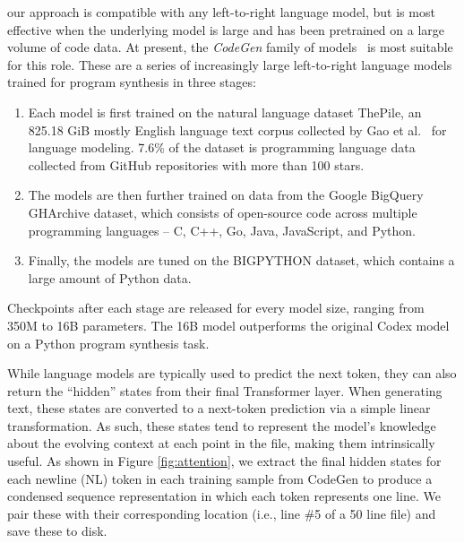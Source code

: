 \documentclass[12pt,openany,oneside,table]{cmuthesis}
\begin{document}
our approach is compatible with any left-to-right language model, but is most effective when the underlying model is large and has been pretrained on a large volume of code data. At present, the \textit{CodeGen} family of models~\cite{nijkamp2022codegen} is most suitable for this role. These are a series of increasingly large left-to-right language models trained for program synthesis in three stages:
\begin{enumerate}
    \item{Each model is first trained on the natural language dataset ThePile, an 825.18 GiB mostly English language text corpus collected by Gao et al.~\cite{gao2020pile} for language modeling. 7.6\% of the dataset is programming language data collected from GitHub repositories with more than 100 stars.}
    \item{The models are then further trained on data from the Google BigQuery GHArchive dataset, which consists of open-source code across multiple programming languages -- C, C++, Go, Java, JavaScript, and Python.}
    \item{Finally, the models are tuned on the BIGPYTHON dataset, which contains a large amount of Python data.}
\end{enumerate}
Checkpoints after each stage are released for every model size, ranging from 350M to 16B parameters. The 16B model outperforms the original Codex model \cite{chen2021evaluating} on a Python program synthesis task.

While language models are typically used to predict the next token, they can also return the ``hidden'' states from their final Transformer layer. When generating text, these states are converted to a next-token prediction via a simple linear transformation. As such, these states tend to represent the model's knowledge about the evolving context at each point in the file, making them intrinsically useful. As shown in Figure \ref{fig:attention}, we extract the final hidden states for each newline (NL) token in each training sample from CodeGen to produce a condensed sequence representation in which each token represents one line. We pair these with their corresponding location (i.e., line \#5 of a 50 line file) and save these to disk.
\end{document}
